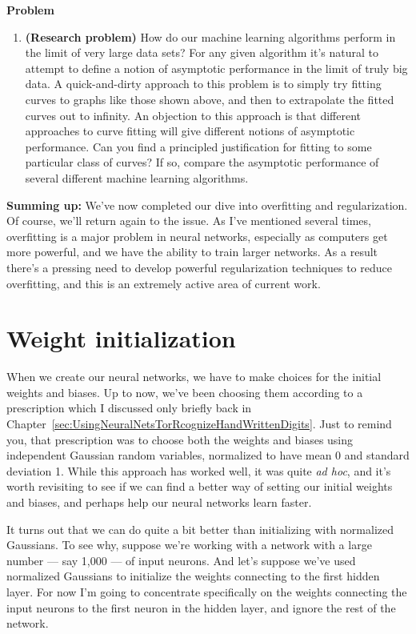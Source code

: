 \textbf{Problem}



\begin{enumerate}
\item \textbf{(Research problem)} How do our machine learning algorithms perform in the limit of very large data sets? For any given algorithm it's natural to attempt to define a notion of asymptotic performance in the limit of truly big data. A quick-and-dirty approach to this problem is to simply try fitting curves to graphs like those shown above, and then to extrapolate the fitted curves out to infinity. An objection to this approach is that different approaches to curve fitting will give different notions of asymptotic performance. Can you find a principled justification for fitting to some particular class of curves? If so, compare the asymptotic performance of several different machine learning algorithms. 
\end{enumerate}


\textbf{Summing up:} We've now completed our dive into overfitting and regularization. Of course, we'll return again to the issue. As I've mentioned several times, overfitting is a major problem in neural networks, especially as computers get more powerful, and we have the ability to train larger networks. As a result there's a pressing need to develop powerful regularization techniques to reduce overfitting, and this is an extremely active area of current work.

\section{Weight initialization}

When we create our neural networks, we have to make choices for the initial weights and biases. Up to now, we've been choosing them according to a prescription which I discussed only briefly back in Chapter~\ref{sec:UsingNeuralNetsTorRcognizeHandWrittenDigits}. Just to remind you, that prescription was to choose both the weights and biases using independent Gaussian random variables, normalized to have mean 0 and standard deviation 1. While this approach has worked well, it was quite \textit{ad hoc}, and it's worth revisiting to see if we can find a better way of setting our initial weights and biases, and perhaps help our neural networks learn faster.

It turns out that we can do quite a bit better than initializing with normalized Gaussians. To see why, suppose we're working with a network with a large number --- say 1,000 --- of input neurons. And let's suppose we've used normalized Gaussians to initialize the weights connecting to the first hidden layer. For now I'm going to concentrate specifically on the weights connecting the input neurons to the first neuron in the hidden layer, and ignore the rest of the network.

